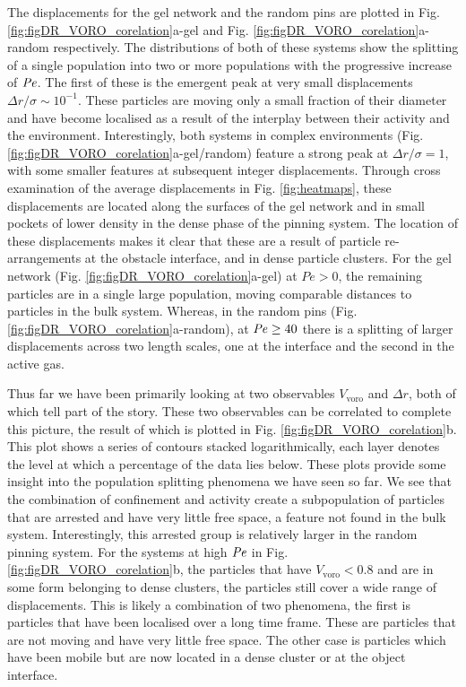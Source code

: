 The displacements for the gel network and the random pins are plotted in Fig. \ref{fig:figDR_VORO_corelation}a-gel and Fig. \ref{fig:figDR_VORO_corelation}a-random respectively. The distributions of both of these systems show the splitting of a single population into two or more populations with the progressive increase of $\operatorname{\mathit{P\kern-.08em e}}$. The first of these is the emergent peak at very small displacements $\Delta r / \sigma \sim 10^{-1}$. These particles are moving only a small fraction of their diameter and have become localised as a result of the interplay between their activity and the environment.
Interestingly, both systems in complex environments (Fig. \ref{fig:figDR_VORO_corelation}a-gel/random) feature a strong peak at $\Delta r / \sigma = 1$, with some smaller features at subsequent integer displacements. Through cross examination of the average displacements in Fig. \ref{fig:heatmaps}, these displacements are located along the surfaces of the gel network and in small pockets of lower density in the dense phase of the pinning system. The location of these displacements makes it clear that these are a result of particle re-arrangements at the obstacle interface, and in dense particle clusters. 
For the gel network (Fig. \ref{fig:figDR_VORO_corelation}a-gel) at $Pe > 0$, the remaining particles are in a single large population, moving comparable distances to particles in the bulk system. Whereas, in the random pins (Fig. \ref{fig:figDR_VORO_corelation}a-random), at $\operatorname{\mathit{P\kern-.08em e}} \geq 40$ there is a splitting of larger displacements across two length scales, one at the interface and the second in the active gas.


Thus far we have been primarily looking at two observables $V_{\textrm{voro}}$ and $\Delta r$, both of which tell part of the story. These two observables can be correlated to complete this picture, the result of which is plotted in Fig. \ref{fig:figDR_VORO_corelation}b. This plot shows a series of contours stacked logarithmically, each layer denotes the level at which a percentage of the data lies below. These plots provide some insight into the population splitting phenomena we have seen so far. We see that the combination of confinement and activity create a subpopulation of particles that are arrested and have very little free space,  a feature not found in the bulk system. Interestingly, this arrested group is relatively larger in the random pinning system. For the systems at high $\operatorname{\mathit{P\kern-.08em e}}$ in Fig. \ref{fig:figDR_VORO_corelation}b, the particles that have $V_{\textrm{voro}} < 0.8$ and are in some form belonging to dense clusters, the particles still cover a wide range of displacements. 
This is likely a combination of two phenomena, the first is particles that have been localised over a long time frame. These are particles that are not moving and have very little free space. The other case is particles which have been mobile but are now located in a dense cluster or at the object interface. 


